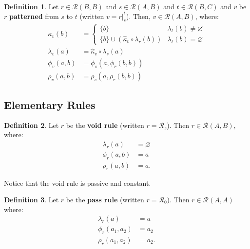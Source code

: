 \documentclass{article}
\theoremstyle{definition}
\newtheorem{definition}{Definition}[subsection]
\theoremstyle{plain}
\def\rule{\mathcal{R}}
\begin{document}
\begin{definition}
  Let $ r \in \rule (B, B) $
  and $ s \in \rule (A, B) $
  and $ t \in \rule (B, C) $
  and $ v $ be $ r $ \textbf{patterned} from $ s $ to $ t $
  (written $ v = r \rvert_{s}^{t} $).
  Then, $ v \in \rule (A, B) $, where:
  \begin{align}
      \kappa_v (b) & = \begin{cases}
                         \{ b \}                                               & \lambda_t (b) \neq \varnothing \\
                         \{ b \} \cup (\widehat{\kappa}_v \circ \lambda_r (b)) & \lambda_t (b) =    \varnothing
                       \end{cases} \\
  \lambda_v (a)    & = \widehat{\kappa}_v \circ \lambda_s (a) \\
     \phi_v (a, b) & = \phi_s (a, \phi_r (b, b)) \\
     \rho_v (a, b) & = \rho_s (a, \rho_r (b, b)) 
  \end{align}
\end{definition}

\subsection{Elementary Rules} %

\begin{definition}
  Let $ r $ be the \textbf{void rule}
  (written $ r = \rule_z $).
  Then $ r \in \rule (A, B) $, where:
  \begin{align}
    \lambda_r (a)    & = \varnothing \\
       \phi_r (a, b) & = a \\
       \rho_r (a, b) & = a.
  \end{align}
\end{definition}

Notice that the void rule is passive and constant.

\begin{definition}
  Let $ r $ be the \textbf{pass rule}
  (written $ r = \rule_0 $).
  Then $ r \in \rule (A, A) $ where:
  \begin{align}
    \lambda_r (a)        & = {a} \\
       \phi_r (a_1, a_2) & =  a_2 \\
       \rho_r (a_1, a_2) & =  a_2.
  \end{align}
\end{definition}
\end{document}
